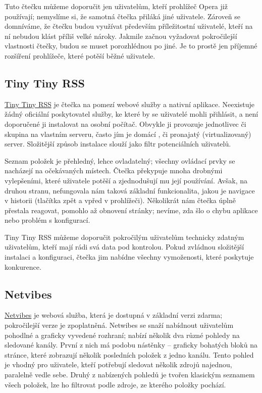 Tuto čtečku můžeme doporučit jen uživatelům, kteří prohlížeč Opera již používají; nemyslíme si, že samotná čtečka přiláká jiné uživatele.
Zároveň se domníváme, že čtečku budou využívat především příležitostní uživatelé, kteří na ní nebudou klást příliš velké nároky.
Jakmile začnou vyžadovat pokročilejší vlastnosti čtečky, budou se muset porozhlédnou po jiné.
Je to prostě jen příjemné rozšíření prohlížeče, které potěší běžné uživatele.

\subsection{Tiny Tiny RSS}

\href{http://tt-rss.org/}{Tiny Tiny RSS} je čtečka na pomezí webové služby a nativní aplikace.
Neexistuje žádný oficiální poskytovatel služby, ke které by se uživatelé mohli přihlásit, a není doporučené ji instalovat na osobní počítač.
Obvykle ji provozuje jednotlivec či skupina na vlastním serveru, často jím je domácí , či pronajatý (virtualizovaný) server.
Složitější způsob instalace slouží jako filtr potenciálních uživatelů.

Seznam položek je přehledný, lehce ovladatelný; všechny ovládací prvky se nacházejí na očekávaných místech.
Čtečka překypuje mnoha drobnými vylepšeními, které uživatele potěší a zjednodušují mu její používání.
Avšak, na druhou stranu, nefungovala nám taková základní funkcionalita, jakou je navigace v historii (tlačítka zpět a vpřed v prohlížeči).
Několikrát nám čtečka úplně přestala reagovat, pomohlo až obnovení stránky; nevíme, zda šlo o chybu aplikace nebo problém s konfigurací.

Tiny Tiny RSS můžeme doporučit pokročilým uživatelům technicky zdatným uživatelům, kteří mají rádi svá data pod kontrolou.
Pokud zvládnou složitější instalaci a konfiguraci, čtečka jim nabídne všechny vymoženosti, které poskytuje konkurence.

\subsection{Netvibes}

\href{http://www.netvibes.com/}{Netvibes} je webová služba, která je dostupná v základní verzi zdarma; pokročilejší verze je zpoplatněná.
Netwibes se snaží nabídnout uživatelům pohodlné a graficky vyvedené rozhraní; nabízí několik dva různé pohledy na sledované kanály.
První z nich má podobu nástěnky -- graficky bohatých bloků na stránce, které zobrazují několik posledních položek z jedno kanálu.
Tento pohled je vhodný pro uživatele, kteří potřebují sledovat několik zdrojů najednou, paralelně vedle sebe.
Druhý z nabízených pohledů je tvořen klasickým seznamem všech položek, lze ho filtrovat podle zdroje, ze kterého položky pochází.

